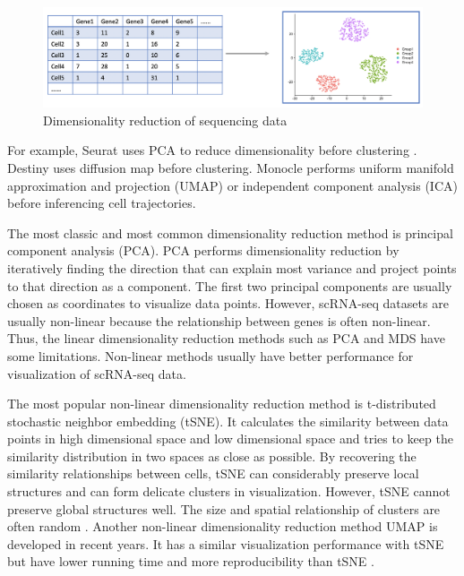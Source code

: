 \begin{figure}[htb!]
    \centering
    \includegraphics[width=1\textwidth]{figures/myfigures/dr1.png}
    \caption{Dimensionality reduction of sequencing data}
    \label{dr1}
\end{figure}

For example, Seurat uses PCA \cite{Abdi2010} to reduce dimensionality before clustering \cite{Satija2015}. Destiny \cite{angerer2016destiny} uses diffusion map before clustering. Monocle \cite{Qiu2017} performs uniform manifold approximation and projection (UMAP) \cite{McInnes2018} or independent component analysis (ICA) \cite{hyvarinen2000independent} before inferencing cell trajectories. 

The most classic and most common dimensionality reduction method is principal component analysis (PCA). PCA performs dimensionality reduction by iteratively finding the direction that can explain most variance and project points to that direction as a component. The first two principal components are usually chosen as coordinates to visualize data points. However, scRNA-seq datasets are usually non-linear because the relationship between genes is often non-linear. Thus, the linear dimensionality reduction methods such as PCA and MDS \cite{Kruskal1964} have some limitations. Non-linear methods usually have better performance for visualization of scRNA-seq data.

The most popular non-linear dimensionality reduction method is t-distributed stochastic neighbor embedding (tSNE). It calculates the similarity between data points in high dimensional space and low dimensional space and tries to keep the similarity distribution in two spaces as close as possible. By recovering the similarity relationships between cells, tSNE can considerably preserve local structures and can form delicate clusters in visualization.  However, tSNE cannot preserve global structures well. The size and spatial relationship of clusters are often random \cite{wattenberg2016how}. Another non-linear dimensionality reduction method UMAP is developed in recent years. It has a similar visualization performance with tSNE \cite{kobak2019umap} but have lower running time and more reproducibility than tSNE \cite{becht2019dimensionality}.

